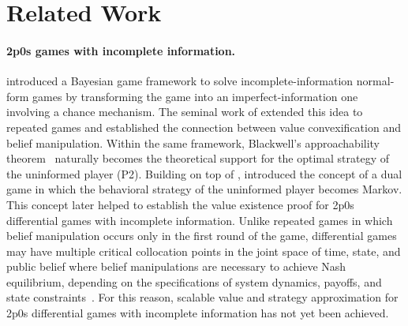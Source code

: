 \section{Related Work}
\paragraph{2p0s games with incomplete information.}
\cite{harsanyi1967games} introduced a Bayesian game framework to solve incomplete-information normal-form games by transforming the game into an imperfect-information one involving a chance mechanism. The seminal work of \cite{aumann1995repeated} extended this idea to repeated games and established the connection between value convexification and belief manipulation. Within the same framework, Blackwell's approachability theorem~\citep{blackwell1956analog} naturally becomes the theoretical support for the optimal strategy of the uninformed player (P2). Building on top of \cite{aumann1995repeated}, \cite{de1996repeated} introduced the concept of a dual game in which the behavioral strategy of the uninformed player becomes Markov. This concept later helped \cite{cardaliaguet2007differential,ghimire24a} to establish the value existence proof for 2p0s differential games with incomplete information. Unlike repeated games in which belief manipulation occurs only in the first round of the game, differential games may have multiple critical collocation points in the joint space of time, state, and public belief where belief manipulations are necessary to achieve Nash equilibrium, depending on the specifications of system dynamics, payoffs, and state constraints~\citep{ghimire24a}. For this reason, scalable value and strategy approximation for 2p0s differential games with incomplete information has not yet been achieved. 

\vspace{-0.05in}
